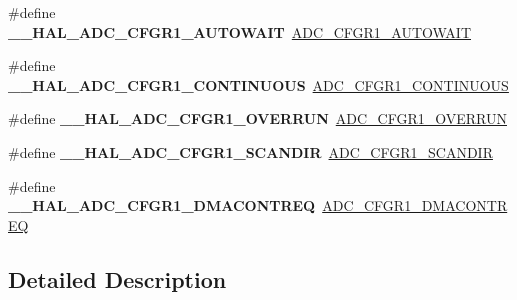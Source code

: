 \begin{DoxyCompactItemize}
\#define {\bfseries \+\_\+\+\_\+\+H\+A\+L\+\_\+\+A\+D\+C\+\_\+\+C\+F\+G\+R1\+\_\+\+A\+U\+T\+O\+W\+A\+IT}~\hyperlink{group___a_d_c___private___macros_ga36fe17d7bad2f7445f201d318779051d}{A\+D\+C\+\_\+\+C\+F\+G\+R1\+\_\+\+A\+U\+T\+O\+W\+A\+IT}
\item 
\mbox{\label{group___h_a_l___a_d_c___aliased___macros_ga6e3bc5992840ed200085c9b3ba68d7d2}} 
\#define {\bfseries \+\_\+\+\_\+\+H\+A\+L\+\_\+\+A\+D\+C\+\_\+\+C\+F\+G\+R1\+\_\+\+C\+O\+N\+T\+I\+N\+U\+O\+US}~\hyperlink{group___a_d_c___private___macros_gaa6d2333361167e3a510b2dd50f824a80}{A\+D\+C\+\_\+\+C\+F\+G\+R1\+\_\+\+C\+O\+N\+T\+I\+N\+U\+O\+US}
\item 
\mbox{\label{group___h_a_l___a_d_c___aliased___macros_ga60d5ad7e386833338f43e293120fd20a}} 
\#define {\bfseries \+\_\+\+\_\+\+H\+A\+L\+\_\+\+A\+D\+C\+\_\+\+C\+F\+G\+R1\+\_\+\+O\+V\+E\+R\+R\+UN}~\hyperlink{group___a_d_c___private___macros_ga0e446f9c5ff062c2f138636c1ea639a1}{A\+D\+C\+\_\+\+C\+F\+G\+R1\+\_\+\+O\+V\+E\+R\+R\+UN}
\item 
\mbox{\label{group___h_a_l___a_d_c___aliased___macros_gacadf737dca92c21560405c914f98ab06}} 
\#define {\bfseries \+\_\+\+\_\+\+H\+A\+L\+\_\+\+A\+D\+C\+\_\+\+C\+F\+G\+R1\+\_\+\+S\+C\+A\+N\+D\+IR}~\hyperlink{group___peripheral___registers___bits___definition_ga138c4d67e5735326ffc922409f3fc8f4}{A\+D\+C\+\_\+\+C\+F\+G\+R1\+\_\+\+S\+C\+A\+N\+D\+IR}
\item 
\mbox{\label{group___h_a_l___a_d_c___aliased___macros_gad36423da25741a685c5aefd3cd0d08ee}} 
\#define {\bfseries \+\_\+\+\_\+\+H\+A\+L\+\_\+\+A\+D\+C\+\_\+\+C\+F\+G\+R1\+\_\+\+D\+M\+A\+C\+O\+N\+T\+R\+EQ}~\hyperlink{group___a_d_c___private___macros_ga06cee7979b56d2ad07f024f394522097}{A\+D\+C\+\_\+\+C\+F\+G\+R1\+\_\+\+D\+M\+A\+C\+O\+N\+T\+R\+EQ}
\end{DoxyCompactItemize}


\subsection{Detailed Description}
